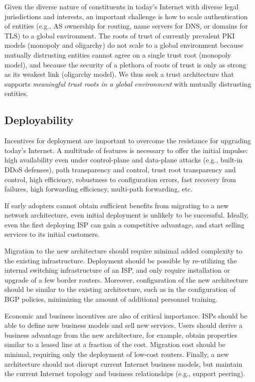 \documentclass[a4paper]{llncs}
\begin{document}

Given the diverse nature of constituents in today's Internet
with diverse legal jurisdictions and interests, an important
challenge is how to scale authentication of entities (e.g., AS ownership for
routing, name servers for DNS, or domains for TLS) to a global environment. The
roots of trust of currently prevalent PKI models (monopoly and oligarchy) do not
scale to a global environment because mutually distrusting entities cannot agree
on a single trust root (monopoly model), and because the security of a plethora
of roots of trust is only as strong as its weakest link (oligarchy model). We
thus seek a trust architecture that supports \emph{meaningful trust roots in a global
environment} with mutually distrusting entities.


\subsection{Deployability}


Incentives for deployment are important to
overcome the resistance for upgrading today's Internet. A multitude of features is
necessary to offer the initial impulse: high availability even under
control-plane and data-plane attacks (e.g., built-in DDoS defenses),
path transparency and control, trust root transparency and control, high efficiency,
robustness to configuration errors, fast recovery from failures, high forwarding efficiency, multi-path forwarding, etc.

If early adopters cannot obtain sufficient benefits from migrating to
a new network architecture, even initial deployment is unlikely to be
successful. Ideally, even the first deploying ISP can gain a
competitive advantage, and start selling services to its initial
customers.

Migration to the new architecture should require minimal added complexity to the
existing infrastructure. Deployment should be possible by re-utilizing the
internal switching infrastructure of an ISP, and only require installation or
upgrade of a few border routers. Moreover, configuration of the new architecture
should be similar to the existing architecture, such as in the configuration of
BGP policies, minimizing the amount of additional personnel training. 

Economic and business incentives are also of critical importance. ISPs should be
able to define new business models and sell new services. Users should derive a
business advantage from the new architecture, for example, obtain properties
similar to a leased line at a fraction of the cost. Migration cost should be
minimal, requiring only the deployment of low-cost routers. Finally, a new
architecture should not disrupt current Internet business models, but maintain
the current Internet topology and business relationships (e.g., support
peering).
\end{document}

